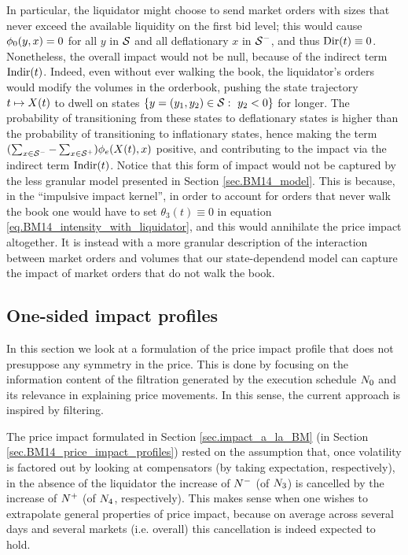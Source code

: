 \documentclass[10pt, article,table]{article}
\begin{document}
 In particular, the liquidator might choose to send market orders with sizes that never exceed the available liquidity on the first bid level; this would cause $\transProb_0(y,x)=0$ for all $y$ in $\stateSpace$ and all deflationary $x$ in $\deflationarySpace$, and thus $\directImpact(t)\equiv 0$. Nonetheless, the overall impact would not be null, because of the indirect term $\indirectImpact(t)$. Indeed, even without ever walking the book, the liquidator's orders would modify the volumes in the orderbook, pushing the state trajectory $t\mapsto \stateVariable(t)$ to dwell on states $\lbrace y=(y_1,y_2)\in\stateSpace: \, \, y_2<0\rbrace$ for longer. The probability of transitioning from these states to deflationary states is higher than the probability of transitioning to inflationary states, hence making the term $(\sum_{x\in\deflationarySpace} - \sum_{x\in\inflationarySpace})\transProb_{e}(\stateVariable(t), x)$ positive, and contributing to the impact via the indirect term $\indirectImpact(t)$.
 Notice that this form of impact would not be captured by the less granular model presented in Section \ref{sec.BM14_model}. This is because, in the ``impulsive impact kernel'', in order to account for orders that never walk the book one would have to set $\theta_3(t)\equiv0$ in equation \eqref{eq.BM14_intensity_with_liquidator}, and this would annihilate the price impact altogether.  It is instead with a more granular description of the interaction between market orders and volumes that our state-dependend model can capture the impact of market orders that do not walk the book.   

\subsection{One-sided impact profiles}\label{sec.one-side_impact}
In this section we look at a formulation of the price impact profile that does not presuppose any symmetry in the price. This is done by focusing on the information content of the filtration generated by the execution schedule $\countingProc[0]$ and its relevance in explaining price movements. In this sense, the current approach is inspired by filtering. 

The price impact formulated in Section \ref{sec.impact_a_la_BM} (in Section \ref{sec.BM14_price_impact_profiles}) rested on the assumption that, once volatility is factored out by looking at compensators (by taking expectation, respectively), in the absence of the liquidator the increase of $\Nminus$ (of $\countingProc[3]$) is cancelled by the increase of $\Nplus$ (of $\countingProc[4]$, respectively). This makes sense when one wishes to extrapolate general properties of price impact, because on average across several days and several markets (i.e. overall) this cancellation is indeed expected to hold.
\end{document}
